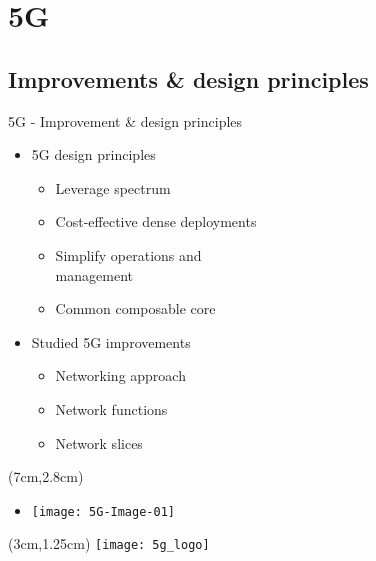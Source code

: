 \section{5G}
\subsection*{Improvements \& design principles}
\begin{frame}{5G - Improvement \& design principles}

  \begin{itemize}
    \item[]<1-> 5G design principles
      \begin{itemize}
      \item<2-> Leverage spectrum
      \item<3-> Cost-effective dense deployments
      \item<4-> Simplify operations and \\ management
      \item<5-> Common composable core
      \end{itemize}
  \end{itemize}

  \begin{itemize}
    \item[]<6-> Studied 5G improvements
      \begin{itemize}
      \item<7-> Networking approach
      \item<8-> Network functions
      \item<9-> Network slices
      \end{itemize}
  \end{itemize}

  \begin{textblock*}{5cm}(7cm,2.8cm)
    \begin{itemize}
      \item[]<9-> \texttt{[image: 5G-Image-01]}
    \end{itemize}
  \end{textblock*}

  \begin{textblock*}{5cm}(3cm,1.25cm)
    \texttt{[image: 5g\_logo]}
  \end{textblock*}
\end{frame}
